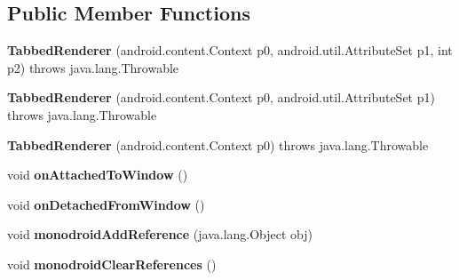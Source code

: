 \subsection*{Public Member Functions}
\begin{DoxyCompactItemize}
\item 
\mbox{\label{classmd5b60ffeb829f638581ab2bb9b1a7f4f3f_1_1TabbedRenderer_a58094d971cda65d13a4494b4c01d6606}} 
{\bfseries Tabbed\+Renderer} (android.\+content.\+Context p0, android.\+util.\+Attribute\+Set p1, int p2)  throws java.\+lang.\+Throwable 	
\item 
\mbox{\label{classmd5b60ffeb829f638581ab2bb9b1a7f4f3f_1_1TabbedRenderer_a3b8fd0e5dc0df3553dda11d43292045a}} 
{\bfseries Tabbed\+Renderer} (android.\+content.\+Context p0, android.\+util.\+Attribute\+Set p1)  throws java.\+lang.\+Throwable 	
\item 
\mbox{\label{classmd5b60ffeb829f638581ab2bb9b1a7f4f3f_1_1TabbedRenderer_a1e7ca4d75fddda52cec47dee49875855}} 
{\bfseries Tabbed\+Renderer} (android.\+content.\+Context p0)  throws java.\+lang.\+Throwable 	
\item 
\mbox{\label{classmd5b60ffeb829f638581ab2bb9b1a7f4f3f_1_1TabbedRenderer_a1e20c6fb1a9e43d31e453be14845d61b}} 
void {\bfseries on\+Attached\+To\+Window} ()
\item 
\mbox{\label{classmd5b60ffeb829f638581ab2bb9b1a7f4f3f_1_1TabbedRenderer_a5ff59fab206273b68a92840b279acd12}} 
void {\bfseries on\+Detached\+From\+Window} ()
\item 
\mbox{\label{classmd5b60ffeb829f638581ab2bb9b1a7f4f3f_1_1TabbedRenderer_a1ac0d0bc3f7d31327bd95fbf0ddf533c}} 
void {\bfseries monodroid\+Add\+Reference} (java.\+lang.\+Object obj)
\item 
\mbox{\label{classmd5b60ffeb829f638581ab2bb9b1a7f4f3f_1_1TabbedRenderer_a798c70a93fbc1b979f670015b6d12ed9}} 
void {\bfseries monodroid\+Clear\+References} ()
\end{DoxyCompactItemize}

